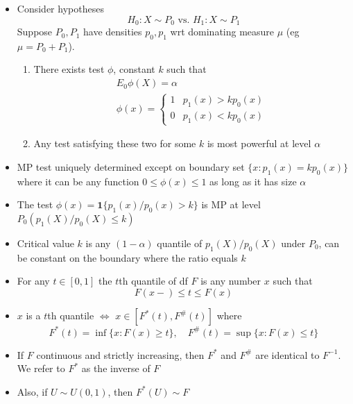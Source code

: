 \documentclass[fontsize=5pt]{scrartcl}
\begin{document}
\begin{multicols}{2}
\begin{itemize}
\item Consider hypotheses
  \begin{equation}
    H_{0}:X\sim P_{0} \text{ vs. } H_{1}:X\sim P_{1}
  \end{equation}
  Suppose $P_{0},P_{1}$ have densities $p_{0},p_{1}$ wrt dominating measure
  $\mu$ (eg $\mu=P_{0}+P_{1}$).
  \begin{enumerate}
  \item There exists test $\phi$, constant $k$ such that
    \begin{gather}
      E_{0}\phi(X) = \alpha \\
      \phi(x) = \begin{cases} 1 & p_{1}(x) > kp_{0}(x) \\ 0 & p_{1}(x)
        < kp_{0}(x) \end{cases}
    \end{gather}
  \item Any test satisfying these two for some $k$ is most powerful at
    level $\alpha$
  \end{enumerate}
\item MP test uniquely determined except on boundary set $\{x
  :p_{1}(x) = kp_{0}(x)\}$ where it can be any function
  $0\leq\phi(x)\leq1$ as long as it has size $\alpha$
\item The test $\phi(x) = \mathbf{1}\{p_{1}(x) /p_{0}(x)>k\}$ is MP
  at level $P_{0}(p_{1}(X)/p_{0}(X)\leq k)$
\item Critical value $k$ is any $(1-\alpha)$ quantile of
  $p_{1}(X)/p_{0}(X)$ under $P_{0}$, can be constant on the boundary
  where the ratio equals $k$

\item For any $t\in[0,1]$ the $t$th quantile of df $F$ is any number
  $x$ such that
  \begin{equation}
    F(x-)\leq t\leq F(x)
  \end{equation}

\item $x$ is a $t$th quantile $\iff$ $x\in[F^{*}(t),F^{\#}(t)]$ where
  \begin{equation}
    F^{*}(t) = \inf\{ x:F(x)\geq t\},\quad F^{\#}(t) =
    \sup\{x:F(x)\leq t\}
  \end{equation}

\item If $F$ continuous and strictly increasing, then $F^{*}$ and
  $F^{\#}$ are identical to $F^{-1}$. We refer to $F^{*}$ as the
  inverse of $F$
\item Also, if $U\sim U(0,1)$, then $F^{*}(U)\sim F$


\end{itemize}
\end{multicols}
\end{document}
